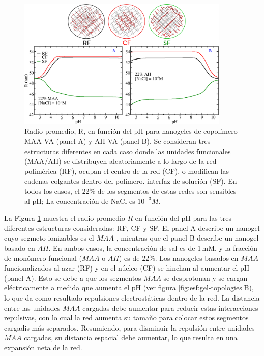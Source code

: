 \begin{figure}[!htb]
     \centering
     \includegraphics[width=0.9\textwidth]{Figures/graphs-gel2/rr.png}
     \caption{Radio promedio, R, en funci\'on del pH para nanogeles de copol\'imero MAA-VA (panel A) y AH-VA (panel B).
     	Se consideran tres estructuras diferentes en cada caso donde las unidades funcionales (MAA/AH) se distribuyen aleatoriamente a lo largo de la red polim\'erica (RF), ocupan el centro de la red (CF), o modifican las cadenas colgantes dentro del pol\'imero. interfaz de soluci\'on (SF).
     	En todos los casos, el $22\%$ de los segmentos de estas redes son sensibles al pH; La concentraci\'on de NaCl es $10^{-3}M$.}
     \label{fig:esf:gel-charge-MAA-AH}
\end{figure}

La Figura \ref{fig:esf:gel-charge-MAA-AH} muestra el radio promedio $R$ en funci\'on del pH para las tres diferentes estructuras consideradas: RF, CF y SF.
El panel A describe un nanogel cuyo segmeto ionizables es el $MAA$ , mientras que el panel B describe un nanogel basado en $AH$.
En ambos casos, la concentraci\'on de sal es de 1\,mM, y la fracci\'on de mon\'omero funcional ($MAA$ o $AH$) es de $22\%$.
Los nanogeles basados en $MAA$ funcionalizados al azar (RF) y en el n\'ucleo (CF) se hinchan al aumentar el pH (panel A).
Esto se debe a que los segmentos $MAA$ se desprotonan y se cargan el\'ectricamente a medida que aumenta el pH (ver figura \ref{fig:esf:gel-topologies}B), lo que da como resultado repulsiones electrost\'aticas dentro de la red.
La distancia entre las unidades $MAA$ cargadas debe aumentar para reducir estas interacciones repulsivas, con lo cual la red aumenta su tama\~no para colocar estos segmentos cargadis m\'as separados.
Resumiendo, para disminuir la repulsi\'on entre unidades $MAA$ cargadas, su distancia espacial debe aumentar, lo que resulta en una expansión neta de la red.




